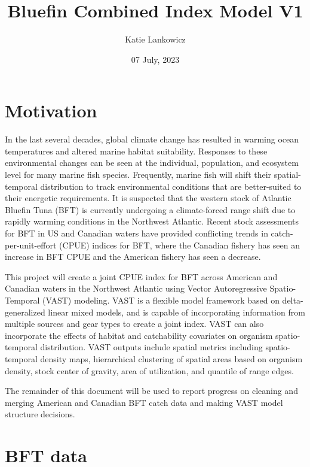 \documentclass[
]{article}
\title{Bluefin Combined Index Model V1}
\author{Katie Lankowicz}
\date{07 July, 2023}
\begin{document}
\maketitle

{
\hypersetup{linkcolor=}
\setcounter{tocdepth}{2}
\tableofcontents
}
\hypertarget{motivation}{%
\section{Motivation}\label{motivation}}

In the last several decades, global climate change has resulted in warming ocean temperatures and altered marine habitat suitability. Responses to these environmental changes can be seen at the individual, population, and ecosystem level for many marine fish species. Frequently, marine fish will shift their spatial-temporal distribution to track environmental conditions that are better-suited to their energetic requirements. It is suspected that the western stock of Atlantic Bluefin Tuna (BFT) is currently undergoing a climate-forced range shift due to rapidly warming conditions in the Northwest Atlantic. Recent stock assessments for BFT in US and Canadian waters have provided conflicting trends in catch-per-unit-effort (CPUE) indices for BFT, where the Canadian fishery has seen an increase in BFT CPUE and the American fishery has seen a decrease.

This project will create a joint CPUE index for BFT across American and Canadian waters in the Northwest Atlantic using Vector Autoregressive Spatio-Temporal (VAST) modeling. VAST is a flexible model framework based on delta-generalized linear mixed models, and is capable of incorporating information from multiple sources and gear types to create a joint index. VAST can also incorporate the effects of habitat and catchability covariates on organism spatio-temporal distribution. VAST outputs include spatial metrics including spatio-temporal density maps, hierarchical clustering of spatial areas based on organism density, stock center of gravity, area of utilization, and quantile of range edges.

The remainder of this document will be used to report progress on cleaning and merging American and Canadian BFT catch data and making VAST model structure decisions.

\hypertarget{bft-data}{%
\section{BFT data}\label{bft-data}}
\end{document}
